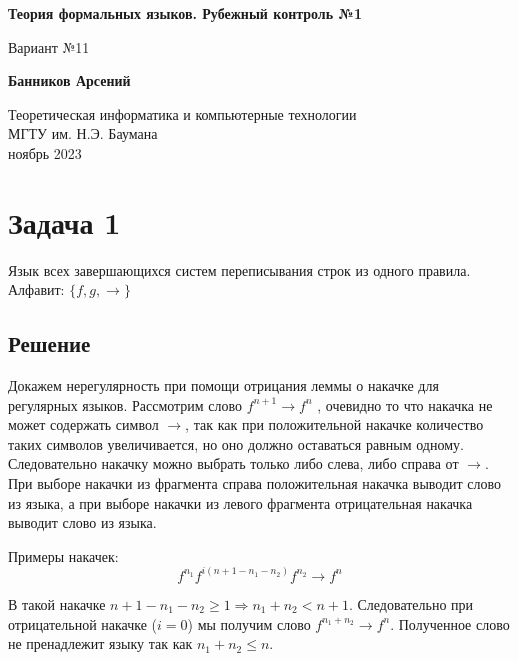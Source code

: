 \documentclass[a4paper, 14pt]{extarticle}
\begin{document}
\begin{titlepage}
  \begin{center}
    \vspace*{1cm}

    \Huge
    \textbf{Теория формальных языков. Рубежный контроль №1}

    \vspace{0.5cm}
    \Large
    Вариант №11

    \vspace{1.5cm}

    \textbf{Банников Арсений}

    \vfill

    \vspace{0.8cm}

    \Large
    Теоретическая информатика и компьютерные технологии\\
    МГТУ им. Н.Э. Баумана\\
    ноябрь 2023

  \end{center}
\end{titlepage}

\newpage

\tableofcontents

\newpage

\section{Задача 1}

Язык всех завершающихся систем переписывания строк из одного правила. Алфавит: $\{f,g,\to\}$

\subsection{Решение}
Докажем нерегулярность при помощи отрицания леммы о накачке для регулярных языков.
Рассмотрим слово $f^{n + 1} \to f^n$ , очевидно то что накачка не может содержать
символ $\to$, так как при положительной накачке количество таких символов увеличивается,
но оно должно оставаться равным одному. Следовательно накачку можно выбрать только
либо слева, либо справа от $\to$. При выборе накачки из фрагмента справа положительная
накачка выводит слово из языка, а при выборе накачки из левого фрагмента отрицательная
накачка выводит слово из языка.

Примеры накачек:
\[ f^{n_1}f^{i (n + 1 - n_1 - n_2)}f^{n_2} \to f^n \tag{1} \]

В такой накачке $n + 1 - n_1 - n_2 \ge 1 \Rightarrow n_1 + n_2 < n + 1$. Следовательно
при отрицательной накачке ($i = 0$) мы получим слово $f^{n_1 + n_2} \to f^n$. Полученное
слово не пренадлежит языку так как $n_1 + n_2 \le n$.
\end{document}
